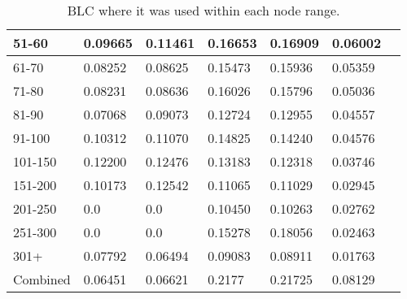 \begin{table*}[h!]
\begin{tabular}{|l|l|l||l|l||l|l|}
        51-60     & 0.09665                                 & 0.11461                        & 0.16653                          & 0.16909        & 0.06002       &                \\ \hline
        61-70     & 0.08252                                 & 0.08625                        & 0.15473                          & 0.15936        & 0.05359       &                \\ \hline
        71-80     & 0.08231                                 & 0.08636                        & 0.16026                          & 0.15796        & 0.05036       &                \\ \hline
        81-90     & 0.07068                                 & 0.09073                        & 0.12724                          & 0.12955        & 0.04557       &                \\ \hline
        91-100    & 0.10312                                 & 0.11070                        & 0.14825                          & 0.14240        & 0.04576       &                \\ \hline
        101-150   & 0.12200                                 & 0.12476                        & 0.13183                          & 0.12318        & 0.03746       &                \\ \hline
        151-200   & 0.10173                                 & 0.12542                        & 0.11065                          & 0.11029        & 0.02945       &                \\ \hline
        201-250   & 0.0                                     & 0.0                            & 0.10450                          & 0.10263        & 0.02762       &                \\ \hline
        251-300   & 0.0                                     & 0.0                            & 0.15278                          & 0.18056        & 0.02463       &                \\ \hline
        301+      & 0.07792                                 & 0.06494                        & 0.09083                          & 0.08911        & 0.01763       &                \\ \hline
        Combined  & 0.06451                                 & 0.06621                        & 0.2177                           & 0.21725        & 0.08129       &                \\ \hline
    \end{tabular}
    \caption{BLC where it was used within each node range.}
    \label{tab:BLC-degree-based-recall}
\end{table*}
